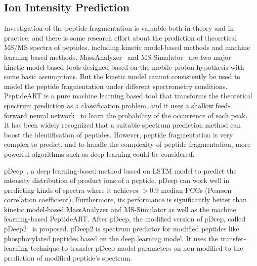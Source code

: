 \subsection{Ion Intensity Prediction}
Investigation of the peptide fragmentation is valuable both in theory and in practice, and there is some research effort about the prediction of theoretical MS/MS spectra of peptides, including kinetic model-based methods and machine learning based methods. MassAnalyzer~\cite{zhang2004prediction, zhang2005prediction} and MS-Simulator~\cite{sun2012ms,wang2015openms} are two major kinetic model-based tools designed based on the mobile proton hypothesis with some basic assumptions. But the kinetic model cannot consistently be used to model the peptide fragmentation under different spectrometry conditions. 
PeptideART is a pure machine learning based tool that transforms the theoretical spectrum prediction as a classification problem, and it uses a shallow feed-forward neural network~\cite{arnold2006machine,li2011accuracy} to learn the probability of the occurrence of each peak.
It has been widely recognized that a suitable spectrum prediction method can boost the identification of peptides. However, peptide fragmentation is very complex to predict, and to handle the complexity of peptide fragmentation, more powerful algorithms such as deep learning could be considered.

pDeep~\cite{zhou2017pdeep}, a deep learning-based method based on LSTM model to predict the intensity distribution of product ions of a peptide. pDeep can
work well in predicting kinds of spectra where it achieves $>$0.9 median PCCs (Pearson correlation coefficient). Furthermore, its performance is significantly better than kinetic model-based MassAnalyzer and MS-Simulator as well as the machine learning-based PeptideART. After pDeep, the modified version of pDeep, called pDeep2~\cite{zeng2019ms} is proposed. pDeep2 is spectrum predictor for modified peptides like phosphorylated peptides based on the deep learning model. It uses the transfer-learning technique to transfer pDeep model parameters on non-modified to the prediction of modified peptide's spectrum.